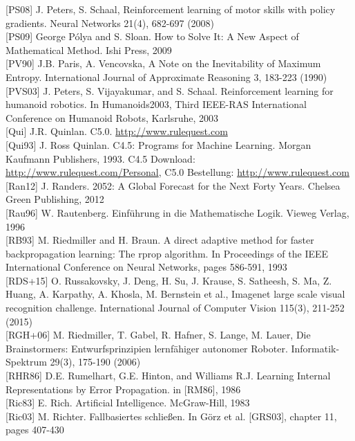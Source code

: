 \documentclass[10pt]{article}
\begin{document}
[PS08] J. Peters, S. Schaal, Reinforcement learning of motor skills with policy gradients. Neural Networks 21(4), 682-697 (2008)\\[0pt]
[PS09] George Pólya and S. Sloan. How to Solve It: A New Aspect of Mathematical Method. Ishi Press, 2009\\[0pt]
[PV90] J.B. Paris, A. Vencovska, A Note on the Inevitability of Maximum Entropy. International Journal of Approximate Reasoning 3, 183-223 (1990)\\[0pt]
[PVS03] J. Peters, S. Vijayakumar, and S. Schaal. Reinforcement learning for humanoid robotics. In Humanoids2003, Third IEEE-RAS International Conference on Humanoid Robots, Karlsruhe, 2003\\[0pt]
[Qui] J.R. Quinlan. C5.0. \href{http://www.rulequest.com}{http://www.rulequest.com}\\[0pt]
[Qui93] J. Ross Quinlan. C4.5: Programs for Machine Learning. Morgan Kaufmann Publishers, 1993. C4.5 Download: \href{http://www.rulequest.com/Personal}{http://www.rulequest.com/Personal}, C5.0 Bestellung: \href{http://www.rulequest.com}{http://www.rulequest.com}\\[0pt]
[Ran12] J. Randers. 2052: A Global Forecast for the Next Forty Years. Chelsea Green Publishing, 2012\\[0pt]
[Rau96] W. Rautenberg. Einführung in die Mathematische Logik. Vieweg Verlag, 1996\\[0pt]
[RB93] M. Riedmiller and H. Braun. A direct adaptive method for faster backpropagation learning: The rprop algorithm. In Proceedings of the IEEE International Conference on Neural Networks, pages 586-591, 1993\\[0pt]
[RDS+15] O. Russakovsky, J. Deng, H. Su, J. Krause, S. Satheesh, S. Ma, Z. Huang, A. Karpathy, A. Khosla, M. Bernstein et al., Imagenet large scale visual recognition challenge. International Journal of Computer Vision 115(3), 211-252 (2015)\\[0pt]
[RGH+06] M. Riedmiller, T. Gabel, R. Hafner, S. Lange, M. Lauer, Die Brainstormers: Entwurfsprinzipien lernfähiger autonomer Roboter. Informatik-Spektrum 29(3), 175-190 (2006)\\[0pt]
[RHR86] D.E. Rumelhart, G.E. Hinton, and Williams R.J. Learning Internal Representations by Error Propagation. in [RM86], 1986\\[0pt]
[Ric83] E. Rich. Artificial Intelligence. McGraw-Hill, 1983\\[0pt]
[Ric03] M. Richter. Fallbasiertes schließen. In Görz et al. [GRS03], chapter 11, pages 407-430\\[0pt]
\end{document}
